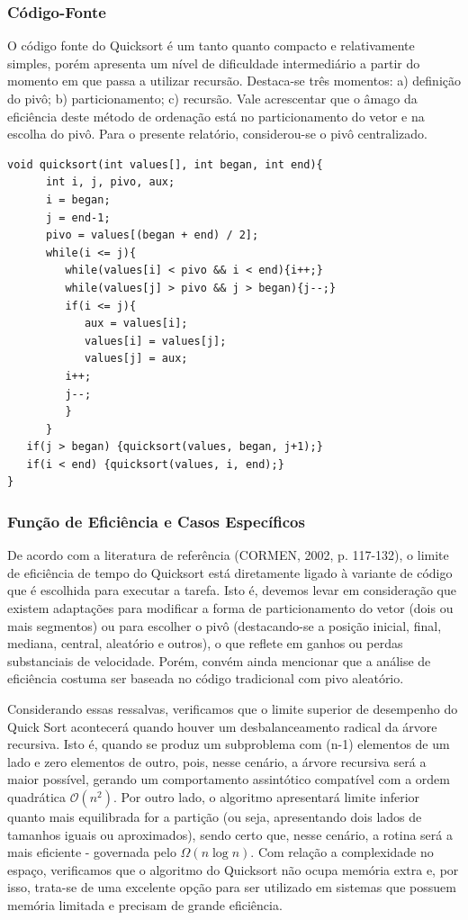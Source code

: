 \documentclass[a4paper, 12pt]{article}
\begin{document}
\subsubsection{Código-Fonte}
\tab{}O código fonte do Quicksort é um tanto quanto compacto e relativamente simples, porém apresenta um nível de dificuldade intermediário a partir do momento em que passa a utilizar recursão. Destaca-se três momentos: a) definição do pivô; b) particionamento; c) recursão. Vale acrescentar que o âmago da eficiência deste método de ordenação está no particionamento do vetor e na escolha do pivô. Para o presente relatório, considerou-se o pivô centralizado.

\begin{verbatim}
void quicksort(int values[], int began, int end){
      int i, j, pivo, aux;
      i = began;
      j = end-1;
      pivo = values[(began + end) / 2];
      while(i <= j){
         while(values[i] < pivo && i < end){i++;}
         while(values[j] > pivo && j > began){j--;}
         if(i <= j){
            aux = values[i];
            values[i] = values[j];
            values[j] = aux;
         i++;
         j--;
         }
      }
   if(j > began) {quicksort(values, began, j+1);}
   if(i < end) {quicksort(values, i, end);}
}
\end{verbatim}

\subsubsection{Função de Eficiência e Casos Específicos}
\tab{} De acordo com a literatura de referência (CORMEN, 2002, p. 117-132), o limite de eficiência de tempo do Quicksort está diretamente ligado à variante de código que é escolhida para executar a tarefa. Isto é, devemos levar em consideração que existem adaptações para modificar a forma de particionamento do vetor (dois ou mais segmentos) ou para escolher o pivô (destacando-se a posição inicial, final, mediana, central, aleatório e outros), o que reflete em ganhos ou perdas substanciais de velocidade. Porém, convém ainda mencionar que a análise de eficiência costuma ser baseada no código tradicional com pivo aleatório. 

Considerando essas ressalvas, verificamos que o limite superior de desempenho do Quick Sort acontecerá quando houver um desbalanceamento radical da árvore recursiva. Isto é, quando se produz um subproblema com (n-1) elementos de um lado e zero elementos de outro, pois, nesse cenário, a árvore recursiva será a maior possível, gerando um comportamento assintótico compatível com a ordem quadrática $\mathcal{O} (n^{2})$. Por outro lado, o algoritmo apresentará limite inferior quanto mais equilibrada for a partição (ou seja, apresentando dois lados de tamanhos iguais ou aproximados), sendo certo que, nesse cenário, a rotina será a mais eficiente - governada pelo $\Omega (n \log{}n)$. Com relação a complexidade no espaço, verificamos que o algoritmo do Quicksort não ocupa memória extra e, por isso, trata-se de uma excelente opção para ser utilizado em sistemas que possuem memória limitada e precisam de grande eficiência.
\end{document}

